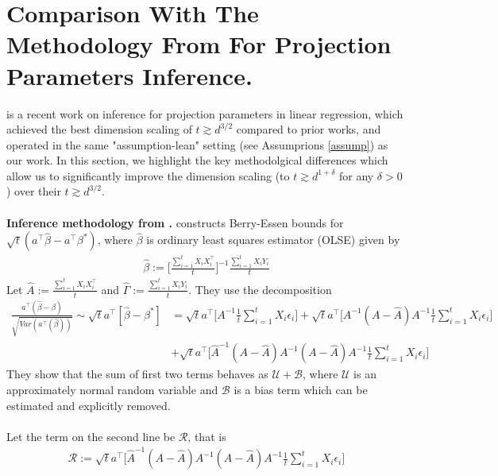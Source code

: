 \documentclass[11pt, reqno,english]{amsart}
\begin{document}
\section{Comparison With The Methodology From \cite{chang2023inference} For Projection Parameters Inference.}\label{methodolgy-difference}
\cite{chang2023inference} is a recent work on inference for projection parameters in linear regression, which achieved the best dimension scaling of $t \gtrsim d^{3/2}$ compared to prior works, and operated in the same "assumption-lean" setting (see Assumprions \ref{assump}) as our work. In this section, we highlight the key methodolgical differences which allow us to significantly improve the dimension scaling (to $t \gtrsim d^{1 + \delta}$ for any $\delta > 0$) over their $t \gtrsim d^{3/2}$.
\\\\
\textbf{Inference methodology from \cite{chang2023inference}.} \cite{chang2023inference} constructs Berry-Essen bounds for $\sqrt{t}(a^\top\hat{\beta} - a^\top \beta^*)$, where $\hat{\beta}$ is ordinary least squares estimator (OLSE) given by
\begin{align*}
    \hat{\beta} := \bigg[\frac{\sum_{i = 1}^t X_i X^\top_i}{t}\bigg]^{-1}\frac{\sum_{i = 1}^t X_i Y_i}{t}
\end{align*}
Let $\hat{A} := \frac{\sum_{i = 1}^t X_i X^\top_i}{t}$ and $\hat{\Gamma} := \frac{\sum_{i = 1}^t X_i Y_i}{t}$. They use the decomposition 
\begin{align*}
     \frac{a^\top (\hat{\beta} - \beta)}{\sqrt{Var(a^\top (\hat{\beta}))}}
     \sim\sqrt{t}a^\top [\hat{\beta} - \beta^*] 
     &= \sqrt{t}a^\top \bigg[A^{-1} \frac{1}{t} \sum_{i = 1}^t X_i \epsilon_i\bigg] + \sqrt{t}a^\top \bigg[A^{-1} (A - \hat{A}) A^{-1} \frac{1}{t} \sum_{i = 1}^t X_i \epsilon_i \bigg]
    \\
    &+ \sqrt{t}a^\top\bigg[\hat{A}^{-1} (A - \hat{A}) A^{-1} (A - \hat{A}) A^{-1} \frac{1}{t}\sum_{i = 1}^t X_i \epsilon_i\bigg]
\end{align*}
They show that the sum of first two terms behaves as $\mathcal U + \mathcal B$, where $\mathcal U$ is an approximately normal random variable and $\mathcal B$ is a bias term which can be estimated and explicitly removed. 
\\\\
Let the term on the second line be $\mathcal R$, that is
\begin{align*}
\mathcal R := \sqrt{t}a^\top\bigg[\hat{A}^{-1} (A - \hat{A}) A^{-1} (A - \hat{A}) A^{-1} \frac{1}{t}\sum_{i = 1}^t X_i \epsilon_i\bigg]
\end{align*}
\end{document}
